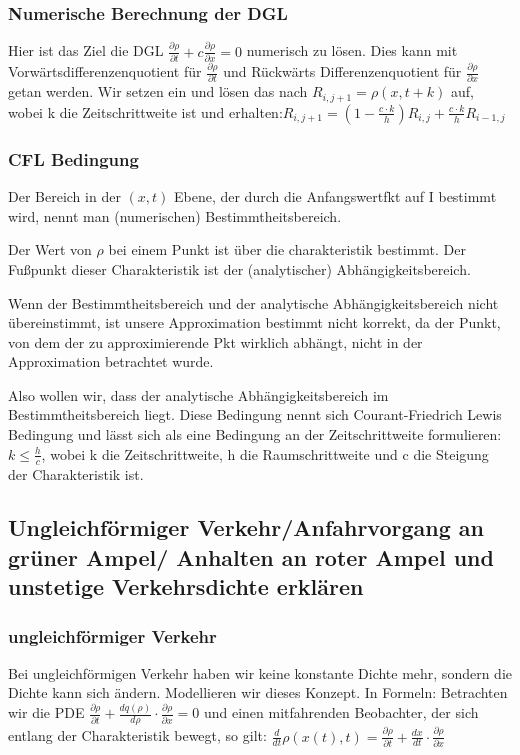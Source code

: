 \documentclass[]{article}
\begin{document}
\subsubsection*{Numerische Berechnung der DGL}
Hier ist das Ziel die DGL $\frac{\partial \rho}{\partial t} + c\frac{\partial \rho}{\partial x}=0$ numerisch zu lösen. Dies kann mit Vorwärtsdifferenzenquotient für $\frac{\partial \rho}{\partial t}$ und Rückwärts Differenzenquotient für $\frac{\partial \rho}{\partial x}$ getan werden. Wir setzen ein und lösen das nach $R_{i,j+1}=\rho(x,t+k)$ auf, wobei k die Zeitschrittweite ist und erhalten:$R_{i,j+1} = \left( 1 - \frac{c \cdot k}{h} \right) R_{i,j} + \frac{c \cdot k}{h} R_{i-1,j}$ 

\subsubsection*{CFL Bedingung}
Der Bereich in der $(x,t)$ Ebene, der durch die Anfangswertfkt auf I bestimmt wird, nennt man (numerischen) Bestimmtheitsbereich. 

Der Wert von $\rho$ bei einem Punkt ist über die charakteristik bestimmt. Der Fußpunkt dieser Charakteristik ist der (analytischer) Abhängigkeitsbereich. 

Wenn der Bestimmtheitsbereich und der analytische Abhängigkeitsbereich nicht übereinstimmt, ist unsere Approximation bestimmt nicht korrekt, da der Punkt, von dem der zu approximierende Pkt wirklich abhängt, nicht in der Approximation betrachtet wurde.


Also wollen wir, dass der analytische Abhängigkeitsbereich im Bestimmtheitsbereich liegt. Diese Bedingung nennt sich Courant-Friedrich Lewis Bedingung und lässt sich als eine Bedingung an der Zeitschrittweite formulieren: $k \le \frac{h}{c}$, wobei k die Zeitschrittweite, h die Raumschrittweite und c die Steigung der Charakteristik ist.  

\subsection*{Ungleichförmiger Verkehr/Anfahrvorgang an grüner Ampel/ Anhalten an roter Ampel und unstetige Verkehrsdichte erklären}

\subsubsection*{ungleichförmiger Verkehr}
Bei ungleichförmigen Verkehr haben wir keine konstante Dichte mehr, sondern die Dichte kann sich ändern. 
Modellieren wir dieses Konzept. 
In Formeln: Betrachten wir die PDE $\frac{\partial \rho}{\partial t} + \frac{d q(\rho)}{d \rho} \cdot \frac{\partial \rho}{\partial x} = 0$ 
und einen mitfahrenden Beobachter, der sich entlang der Charakteristik bewegt, so gilt: $\frac{d}{dt} \rho(x(t), t) = \frac{\partial \rho}{\partial t} + \frac{dx}{dt} \cdot \frac{\partial \rho}{\partial x}$
\end{document}
